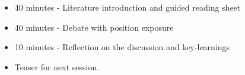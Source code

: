 \documentclass{../sharedAssets/tufte}
\begin{document}
{  
  \begin{itemize}
    \item 40 minutes - Literature introduction and guided reading sheet 
    \item 40 minutes - Debate with position exposure
    \item 10 minutes - Reflection on the discussion and key-learnings
    \item Teaser for next session.
  \end{itemize}
}





\mainmatter
\authorinrectoheader





%

\appendix






\end{document}
